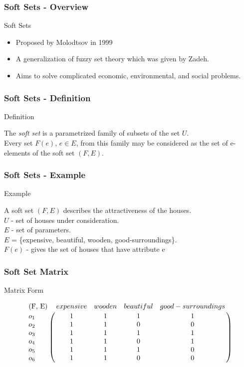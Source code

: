 \documentclass{beamer}
\begin{document}
  \begin{frame}
    \frametitle{Soft Sets - Overview}
    \begin{LARGE}
    Soft Sets
    \end{LARGE}
    \begin{itemize}
    	\item Proposed by Molodtsov in 1999 \cite{firstresults}
    	\item A generalization of fuzzy set theory which was given by Zadeh.  
    	\item Aims to solve complicated economic, environmental, and social problems.
    \end{itemize}
  \end{frame}
  
  \begin{frame}
  \frametitle{Soft Sets - Definition}
      \begin{LARGE}
    Definition
    \end{LARGE}
  
    The \emph{soft set} is a parametrized family of subsets of the set $U$. \\
    Every set $F(e)$,
$e \in E$, from this family may be considered as the set of e-elements of the soft set $(F, E)$. \cite{firstresults}
  
  \end{frame}
  
  \begin{frame}
  \frametitle{Soft Sets - Example}
    \begin{LARGE}
    Example
    \end{LARGE}
    
  A soft set $(F, E)$ describes the attractiveness of the houses. \\
$U$ - set of houses under consideration.\\
$E$ - set of parameters.\\
$E$ = \{expensive, beautiful, wooden, good-surroundings\}. \\
$F(e)$ - gives the set of houses that have attribute e
  \end{frame}
  
  
  \begin{frame}
    \frametitle{Soft Set Matrix \cite{softmatrix}}
    \begin{LARGE}
    Matrix Form 
    \end{LARGE}
    $$\bordermatrix{
    \text{(F, E)} & expensive & wooden & beautiful & good-surroundings\cr
	o_1 & 1 & 1 & 1 & 1\cr
	o_2 & 1 & 1 & 0 & 0\cr
	o_3 & 1 & 1 & 1 & 1\cr
	o_4 & 1 & 1 & 0 & 1\cr
	o_5 & 1 & 1 & 1 & 0\cr
	o_6 & 1 & 1 & 0 & 0\cr}$$

  \end{frame}
\end{document}
